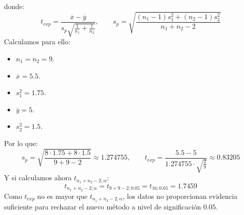\begin{ejercicio}
    donde:
    \begin{equation*}
        t_{exp} = \frac{\overline{x}-\overline{y}}{s_p\sqrt{\frac{1}{n_1}+\frac{1}{n_2}}}, \qquad s_p = \sqrt{\frac{(n_1-1)s_1^2+(n_2-1)s_2^2}{n_1+n_2-2}}
    \end{equation*}
    Calculamos para ello:
    \begin{itemize}
        \item $n_1 = n_2 = 9$.
        \item $\overline{x} = 5.5$.
        \item $s_1^2 = 1.75$.
        \item $\overline{y} = 5$.
        \item $s_2^2 = 1.5$.
    \end{itemize}
    Por lo que:
    \begin{equation*}
        s_p = \sqrt{\frac{8\cdot 1.75 + 8\cdot 1.5}{9+9-2}} \approx 1.274755, \qquad 
        t_{exp} = \frac{5.5 - 5}{1.274755\cdot \sqrt{\frac{2}{9}}} \approx 0.83205
    \end{equation*}
    Y si calculamos ahora $t_{n_1+n_2-2;\alpha}$:
    \begin{equation*}
        t_{n_1+n_2-2;\alpha} = t_{9+9-2;0.05} = t_{16;0.05} = 1.7459
    \end{equation*}
    Como $t_{exp}$ no es mayor que $t_{n_1+n_2-2;\alpha}$, los datos no proporcionan evidencia suficiente para rechazar el nuevo método a nivel de significación $0.05$. %
\end{ejercicio}

